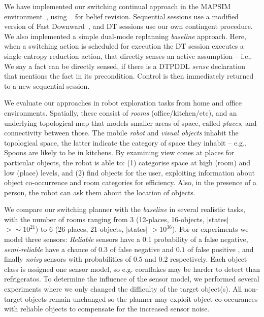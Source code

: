 
We have implemented our switching continual approach in the MAPSIM
environment~\cite{brenner:nebel:jaamas09},
using ~\cite{king:2009} for belief
revision. Sequential sessions use a modified version of Fast
Downward~\cite{fast-downward}, and DT sessions use our own contingent
procedure. We also implemented a simple dual-mode replanning {\em
baseline} approach. Here, when a switching action is scheduled for
execution the DT session executes a single entropy reduction action,
that directly senses an active assumption -- i.e,. We say a fact can
be directly sensed, if there is a DTPDDL {\em sense} declaration that
mentions the fact in its precondition.  Control is then immediately
returned to a new sequential session.


We evaluate our approaches in robot exploration tasks from home and
office environments. Spatially, these consist of {\em rooms}
(office/kitchen/etc), and an underlying topological map that models
smaller areas of space, called {\em places}, and connectivity between
those. The mobile {\em robot} and {\em visual objects} inhabit the
topological space, the latter indicate the category of space they
inhabit -- e.g., Spoons are likely to be in kitchens. By examining
view cones at places for particular objects, the robot is able to: (1)
categorise space at high (room) and low (place) levels, and (2) find
objects for the user, exploiting information about object
co-occurrence and room categories for efficiency. Also, in the
presence of a person, the robot can ask them about the location of
objects. 


We compare our switching planner with the {\em baseline} in several
realistic tasks, with the number of rooms ranging from 3 (12-places,
16-objects, $|$states$|$$>\sim10^{21}$) to 6 (26-places, 21-objects,
$|$states$|$ $>10^{36}$). For or experiments we model three sensors:
{\em Reliable} sensors have a $0.1$ probability of a false negative,
{\em semi-reliable} have a chance of $0.3$ of false negative and $0.1$
of false positive , and finally {\em noisy} sensors with probabilities
of $0.5$ and $0.2$ respectively. Each object class is assigned one
sensor model, so e.g. cornflakes may be harder to detect than
refrigeratos. To determine the influence of the sensor model, we
performed several experiments where we only changed the difficulty of
the target object(s). All non-target objects remain unchanged so the
planner may exploit object co-occurances with reliable objects to
compensate for the increased sensor noise.

